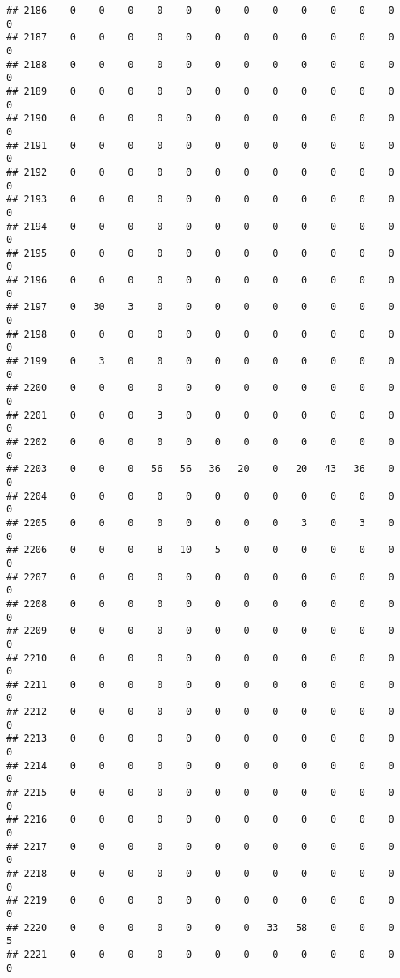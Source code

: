 \documentclass[]{article}
\begin{document}
\begin{verbatim}
## 2186    0    0    0    0    0    0    0    0    0    0    0    0    0
## 2187    0    0    0    0    0    0    0    0    0    0    0    0    0
## 2188    0    0    0    0    0    0    0    0    0    0    0    0    0
## 2189    0    0    0    0    0    0    0    0    0    0    0    0    0
## 2190    0    0    0    0    0    0    0    0    0    0    0    0    0
## 2191    0    0    0    0    0    0    0    0    0    0    0    0    0
## 2192    0    0    0    0    0    0    0    0    0    0    0    0    0
## 2193    0    0    0    0    0    0    0    0    0    0    0    0    0
## 2194    0    0    0    0    0    0    0    0    0    0    0    0    0
## 2195    0    0    0    0    0    0    0    0    0    0    0    0    0
## 2196    0    0    0    0    0    0    0    0    0    0    0    0    0
## 2197    0   30    3    0    0    0    0    0    0    0    0    0    0
## 2198    0    0    0    0    0    0    0    0    0    0    0    0    0
## 2199    0    3    0    0    0    0    0    0    0    0    0    0    0
## 2200    0    0    0    0    0    0    0    0    0    0    0    0    0
## 2201    0    0    0    3    0    0    0    0    0    0    0    0    0
## 2202    0    0    0    0    0    0    0    0    0    0    0    0    0
## 2203    0    0    0   56   56   36   20    0   20   43   36    0    0
## 2204    0    0    0    0    0    0    0    0    0    0    0    0    0
## 2205    0    0    0    0    0    0    0    0    3    0    3    0    0
## 2206    0    0    0    8   10    5    0    0    0    0    0    0    0
## 2207    0    0    0    0    0    0    0    0    0    0    0    0    0
## 2208    0    0    0    0    0    0    0    0    0    0    0    0    0
## 2209    0    0    0    0    0    0    0    0    0    0    0    0    0
## 2210    0    0    0    0    0    0    0    0    0    0    0    0    0
## 2211    0    0    0    0    0    0    0    0    0    0    0    0    0
## 2212    0    0    0    0    0    0    0    0    0    0    0    0    0
## 2213    0    0    0    0    0    0    0    0    0    0    0    0    0
## 2214    0    0    0    0    0    0    0    0    0    0    0    0    0
## 2215    0    0    0    0    0    0    0    0    0    0    0    0    0
## 2216    0    0    0    0    0    0    0    0    0    0    0    0    0
## 2217    0    0    0    0    0    0    0    0    0    0    0    0    0
## 2218    0    0    0    0    0    0    0    0    0    0    0    0    0
## 2219    0    0    0    0    0    0    0    0    0    0    0    0    0
## 2220    0    0    0    0    0    0    0   33   58    0    0    0    5
## 2221    0    0    0    0    0    0    0    0    0    0    0    0    0

\end{verbatim}
\end{document}
